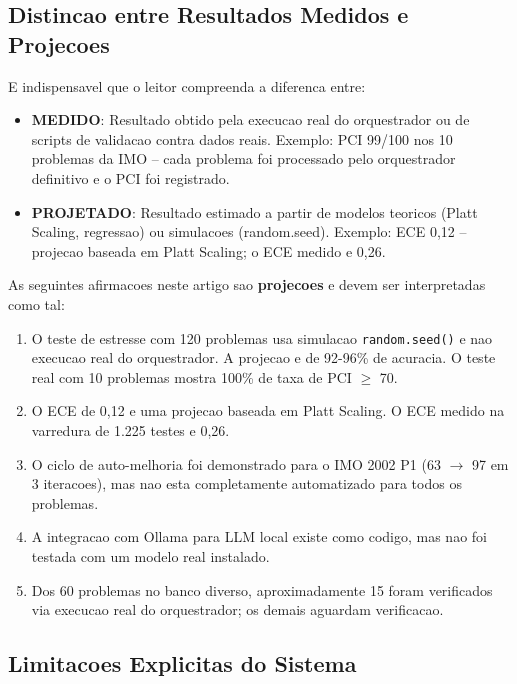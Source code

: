 \documentclass[5p]{elsarticle}
\begin{document}
\subsection{Distincao entre Resultados Medidos e Projecoes}

E indispensavel que o leitor compreenda a diferenca entre:

\begin{itemize}
 \item \textbf{MEDIDO}: Resultado obtido pela execucao real do orquestrador
 ou de scripts de validacao contra dados reais. Exemplo: PCI 99/100 nos
 10 problemas da IMO -- cada problema foi processado pelo orquestrador
 definitivo e o PCI foi registrado.
 \item \textbf{PROJETADO}: Resultado estimado a partir de modelos teoricos
 (Platt Scaling, regressao) ou simulacoes (random.seed). Exemplo: ECE 0,12
 -- projecao baseada em Platt Scaling; o ECE medido e 0,26.
\end{itemize}

As seguintes afirmacoes neste artigo sao \textbf{projecoes} e devem ser
interpretadas como tal:

\begin{enumerate}[label=(\arabic*)]
 \item O teste de estresse com 120 problemas usa simulacao \texttt{random.seed()}
 e nao execucao real do orquestrador. A projecao e de 92-96\% de acuracia.
 O teste real com 10 problemas mostra 100\% de taxa de PCI $\geq$ 70.
 \item O ECE de 0,12 e uma projecao baseada em Platt Scaling. O ECE medido
 na varredura de 1.225 testes e 0,26.
 \item O ciclo de auto-melhoria foi demonstrado para o IMO 2002 P1 (63 $\to$ 97
 em 3 iteracoes), mas nao esta completamente automatizado para todos os
 problemas.
 \item A integracao com Ollama para LLM local existe como codigo, mas nao foi
 testada com um modelo real instalado.
 \item Dos 60 problemas no banco diverso, aproximadamente 15 foram verificados
 via execucao real do orquestrador; os demais aguardam verificacao.
\end{enumerate}

\subsection{Limitacoes Explicitas do Sistema}
\end{document}

